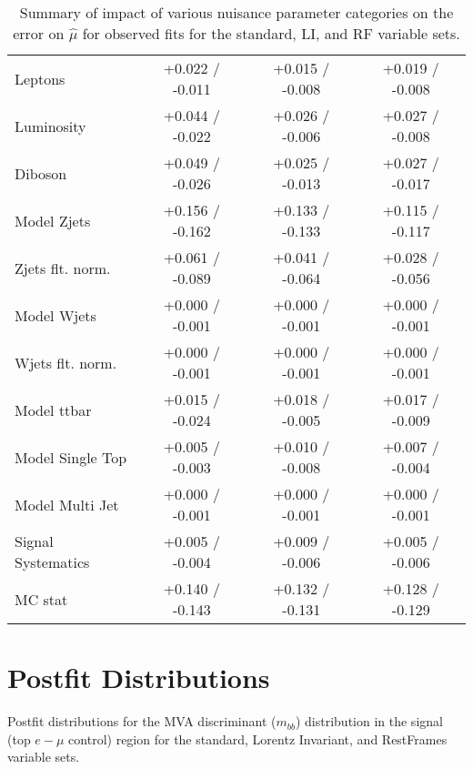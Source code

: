 \begin{table}[!htbp]
\begin{center}
\begin{tabular}{lccc}
Leptons &  +0.022 / -0.011  &  +0.015 / -0.008  &  +0.019 / -0.008 \\
Luminosity &  +0.044 / -0.022  &  +0.026 / -0.006  &  +0.027 / -0.008 \\
Diboson &  +0.049 / -0.026  &  +0.025 / -0.013  &  +0.027 / -0.017 \\
Model Zjets &  +0.156 / -0.162  &  +0.133 / -0.133  &  +0.115 / -0.117 \\
Zjets flt. norm. &  +0.061 / -0.089  &  +0.041 / -0.064  &  +0.028 / -0.056 \\
Model Wjets &  +0.000 / -0.001  &  +0.000 / -0.001  &  +0.000 / -0.001 \\
Wjets flt. norm. &  +0.000 / -0.001  &  +0.000 / -0.001  &  +0.000 / -0.001 \\
Model ttbar &  +0.015 / -0.024  &  +0.018 / -0.005  &  +0.017 / -0.009 \\
Model Single Top &  +0.005 / -0.003  &  +0.010 / -0.008  &  +0.007 / -0.004 \\
Model Multi Jet &  +0.000 / -0.001  &  +0.000 / -0.001  &  +0.000 / -0.001 \\
Signal Systematics &  +0.005 / -0.004  &  +0.009 / -0.006  &  +0.005 / -0.006 \\
MC stat &  +0.140 / -0.143  &  +0.132 / -0.131  &  +0.128 / -0.129 \\
\hline\hline
\end{tabular}
\end{center}
\caption{Summary of impact of various nuisance parameter categories on the error on $\hat{\mu}$ for observed fits for the standard, LI, and RF variable sets.}
\label{tab:obsbdvz}
\end{table}

\clearpage
\section{Postfit Distributions}
Postfit distributions for the MVA discriminant ($m_{bb}$) distribution in the signal (top $e-\mu$ control) region for the standard, Lorentz Invariant, and RestFrames variable sets.


